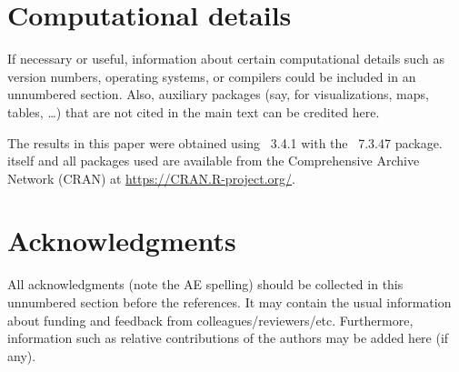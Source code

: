 \documentclass[article]{jss}\usepackage{knitr}
\begin{document}

\section*{Computational details}

\begin{leftbar}
If necessary or useful, information about certain computational details
such as version numbers, operating systems, or compilers could be included
in an unnumbered section. Also, auxiliary packages (say, for visualizations,
maps, tables, \dots) that are not cited in the main text can be credited here.
\end{leftbar}

The results in this paper were obtained using
~3.4.1 with the
~7.3.47 package.  itself
and all packages used are available from the Comprehensive
 Archive Network (CRAN) at
\url{https://CRAN.R-project.org/}.


\section*{Acknowledgments}

\begin{leftbar}
All acknowledgments (note the AE spelling) should be collected in this
unnumbered section before the references. It may contain the usual information
about funding and feedback from colleagues/reviewers/etc. Furthermore,
information such as relative contributions of the authors may be added here
(if any).
\end{leftbar}







\newpage
\end{document}
